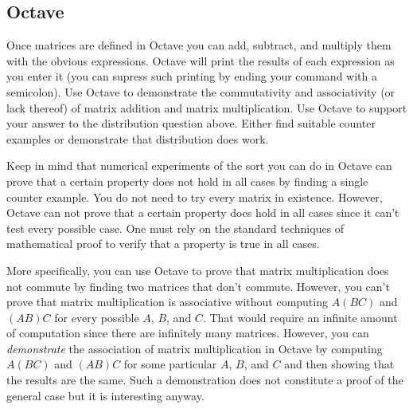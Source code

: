 \subsection*{Octave}

Once matrices are defined in Octave you can add, subtract, and multiply them with the obvious
expressions. Octave will print the results of each expression as you enter it (you can supress
such printing by ending your command with a semicolon). Use Octave to demonstrate the
commutativity and associativity (or lack thereof) of matrix addition and matrix multiplication.
Use Octave to support your answer to the distribution question above. Either find suitable
counter examples or demonstrate that distribution does work.

Keep in mind that numerical experiments of the sort you can do in Octave can prove that a
certain property does not hold in all cases by finding a single counter example. You do not need
to try every matrix in existence. However, Octave can not prove that a certain property does
hold in all cases since it can't test every possible case. One must rely on the standard
techniques of mathematical proof to verify that a property is true in all cases.

More specifically, you can use Octave to prove that matrix multiplication does not commute by
finding two matrices that don't commute. However, you can't prove that matrix multiplication is
associative without computing $A(BC)$ and $(AB)C$ for every possible $A$, $B$, and $C$. That
would require an infinite amount of computation since there are infinitely many matrices.
However, you can \emph{demonstrate} the association of matrix multiplication in Octave by
computing $A(BC)$ and $(AB)C$ for some particular $A$, $B$, and $C$ and then showing that the
results are the same. Such a demonstration does not constitute a proof of the general case but
it is interesting anyway.

